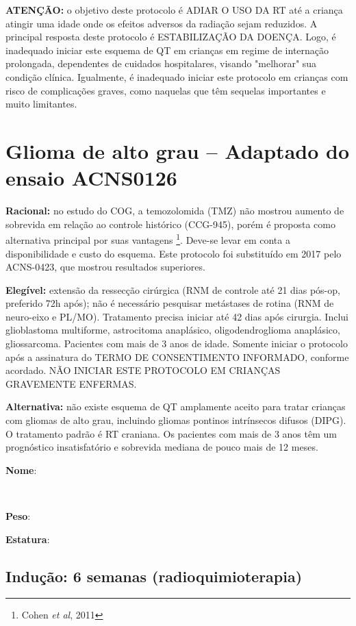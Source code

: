 \documentclass[11pt,a4paper,oldfontcommands]{memoir}
\def\entrywithlabel[#1]#2{\parbox{#1}{{\small #2:} \hrulefill}}
\begin{document}
\textbf{ATENÇÃO:} o objetivo deste protocolo é ADIAR O USO DA RT até a criança atingir uma idade onde os efeitos adversos da radiação sejam reduzidos. A principal resposta deste protocolo é ESTABILIZAÇÃO DA DOENÇA. Logo, é inadequado iniciar este esquema de QT em crianças em regime de internação prolongada, dependentes de cuidados hospitalares, visando "melhorar" sua condição clínica. Igualmente, é inadequado iniciar este protocolo em crianças com risco de complicações graves, como naquelas que têm sequelas importantes e muito limitantes.

\cleardoublepage
\section{Glioma de alto grau -- Adaptado do ensaio ACNS0126}
{\let\thefootnote\relax{}}
\textbf{Racional:} no estudo do COG, a temozolomida (TMZ) não mostrou aumento de sobrevida em relação ao controle histórico (CCG-945), porém é proposta como alternativa principal por suas vantagens \footnote{Cohen \textit{et al}, 2011}. Deve-se levar em conta a disponibilidade e custo do esquema. Este protocolo foi substituído em 2017 pelo ACNS-0423, que mostrou resultados superiores.

\textbf{Elegível:} extensão da ressecção cirúrgica (RNM de controle até 21 dias pós-op, preferido 72h após); não é necessário pesquisar metástases de rotina (RNM de neuro-eixo e PL/MO). Tratamento precisa iniciar até 42 dias após cirurgia. Inclui glioblastoma multiforme, astrocitoma anaplásico, oligodendroglioma anaplásico, gliossarcoma. Pacientes com mais de 3 anos de idade. Somente iniciar o protocolo após a assinatura do TERMO DE CONSENTIMENTO INFORMADO, conforme acordado. NÃO INICIAR ESTE PROTOCOLO EM CRIANÇAS GRAVEMENTE ENFERMAS.

\textbf{Alternativa:} não existe esquema de QT amplamente aceito para tratar crianças com gliomas de alto grau, incluindo gliomas pontinos intrínsecos difusos (DIPG). O tratamento padrão é RT craniana. Os pacientes com mais de 3 anos têm um prognóstico insatisfatório e sobrevida mediana de pouco mais de 12 meses.
\\[0.4cm]
\entrywithlabel[1\hsize]{\textbf{Nome}}\hfill
\\[0.3cm]
\entrywithlabel[.45\hsize]{\textbf{Peso}}\hfill  \entrywithlabel[.45\hsize]{\textbf{Estatura}}

\subsection{Indução: 6 semanas (radioquimioterapia)}
\end{document}
